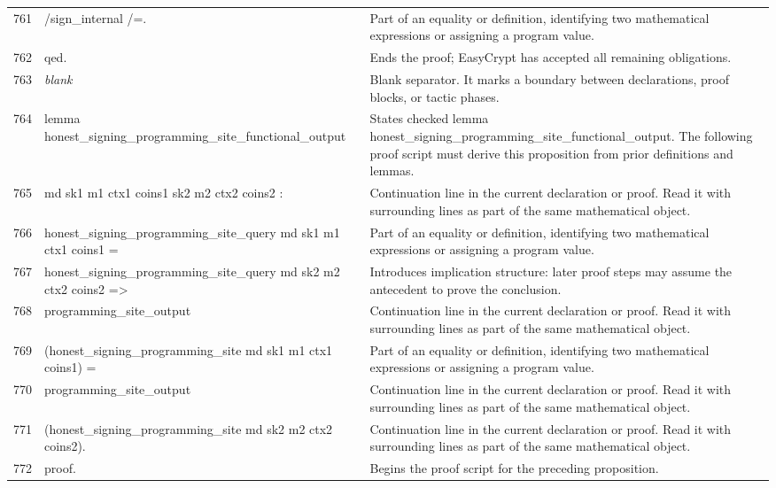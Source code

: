 \documentclass[10pt]{article}
\begin{document}
\begin{longtable}{r L{0.53\textwidth} L{0.37\textwidth}}
761 & {\ttfamily\scriptsize            /sign\_internal /=.} & Part of an equality or definition, identifying two mathematical expressions or assigning a program value. \\
762 & {\ttfamily\scriptsize qed.} & Ends the proof; EasyCrypt has accepted all remaining obligations. \\
763 & {\ttfamily\scriptsize \emph{blank}} & Blank separator.  It marks a boundary between declarations, proof blocks, or tactic phases. \\
764 & {\ttfamily\scriptsize lemma honest\_signing\_programming\_site\_functional\_output} & States checked lemma honest\_signing\_programming\_site\_functional\_output.  The following proof script must derive this proposition from prior definitions and lemmas. \\
765 & {\ttfamily\scriptsize   md sk1 m1 ctx1 coins1 sk2 m2 ctx2 coins2 :} & Continuation line in the current declaration or proof.  Read it with surrounding lines as part of the same mathematical object. \\
766 & {\ttfamily\scriptsize   honest\_signing\_programming\_site\_query md sk1 m1 ctx1 coins1 =} & Part of an equality or definition, identifying two mathematical expressions or assigning a program value. \\
767 & {\ttfamily\scriptsize   honest\_signing\_programming\_site\_query md sk2 m2 ctx2 coins2 =>} & Introduces implication structure: later proof steps may assume the antecedent to prove the conclusion. \\
768 & {\ttfamily\scriptsize   programming\_site\_output} & Continuation line in the current declaration or proof.  Read it with surrounding lines as part of the same mathematical object. \\
769 & {\ttfamily\scriptsize     (honest\_signing\_programming\_site md sk1 m1 ctx1 coins1) =} & Part of an equality or definition, identifying two mathematical expressions or assigning a program value. \\
770 & {\ttfamily\scriptsize   programming\_site\_output} & Continuation line in the current declaration or proof.  Read it with surrounding lines as part of the same mathematical object. \\
771 & {\ttfamily\scriptsize     (honest\_signing\_programming\_site md sk2 m2 ctx2 coins2).} & Continuation line in the current declaration or proof.  Read it with surrounding lines as part of the same mathematical object. \\
772 & {\ttfamily\scriptsize proof.} & Begins the proof script for the preceding proposition. \\

\end{longtable}
\end{document}
